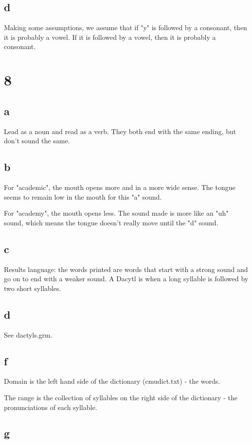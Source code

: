 \documentclass[12pt, letterpaper]{article}
\begin{document}
\subsection{d}
Making some assumptions, we assume that if "y" is followed by a consonant, then it is probably a vowel. If it is followed by a vowel, then it is probably a consonant. 

\section{8}
\subsection{a}
Lead as a noun and read as a verb. They both end with the same ending, but don't sound the same. 

\subsection{b}
For "academic", the mouth opens more and in a more wide sense. The tongue seems to remain low in the mouth for this "a" sound.

For "academy", the mouth opens less. The sound made is more like an "uh" sound, which means the tongue doesn't really move until the "d" sound. 

\subsection{c}
Results language: the words printed are words that start with a strong sound and go on to end with a weaker sound. A Dacytl is when a long syllable is followed by two short syllables. 

\subsection{d}
See dactyls.grm.

\subsection{f}
Domain is the left hand side of the dictionary (cmudict.txt) - the words.

The range is the collection of syllables on the right side of the dictionary - the pronunciations of each syllable.

\subsection{g}
\end{document}
